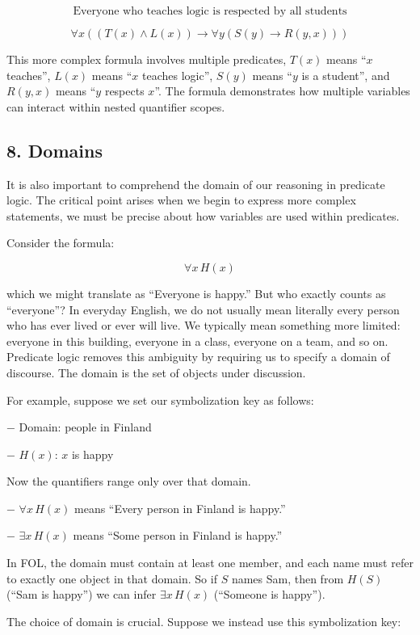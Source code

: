 \[\text{Everyone who teaches logic is respected by all students}\]

\[\forall x ((T(x) \land L(x)) \rightarrow \forall y (S(y) \rightarrow R(y,x)))\]

This more complex formula involves multiple predicates, \(T(x)\) means
``\(x\) teaches'', \(L(x)\) means ``\(x\) teaches logic'', \(S(y)\)
means ``\(y\) is a student'', and \(R(y,x)\) means ``\(y\) respects
\(x\)''. The formula demonstrates how multiple variables can interact
within nested quantifier scopes.

\subsection{8. Domains}\label{domains}

It is also important to comprehend the domain of our reasoning in
predicate logic. The critical point arises when we begin to express more
complex statements, we must be precise about how variables are used
within predicates.

Consider the formula:

\[\forall x \, H(x)\]

which we might translate as ``Everyone is happy.'' But who exactly
counts as ``everyone''? In everyday English, we do not usually mean
literally every person who has ever lived or ever will live. We
typically mean something more limited: everyone in this building,
everyone in a class, everyone on a team, and so on. Predicate logic
removes this ambiguity by requiring us to specify a domain of discourse.
The domain is the set of objects under discussion.

For example, suppose we set our symbolization key as follows:

− Domain: people in Finland

− \(H(x)\): \(x\) is happy

Now the quantifiers range only over that domain.

− \(\forall x \, H(x)\) means ``Every person in Finland is happy.''

− \(\exists x \, H(x)\) means ``Some person in Finland is happy.''

In FOL, the domain must contain at least one member, and each name must
refer to exactly one object in that domain. So if \(S\) names Sam, then
from \(H(S)\) (``Sam is happy'') we can infer \(\exists x \, H(x)\)
(``Someone is happy'').

The choice of domain is crucial. Suppose we instead use this
symbolization key:

